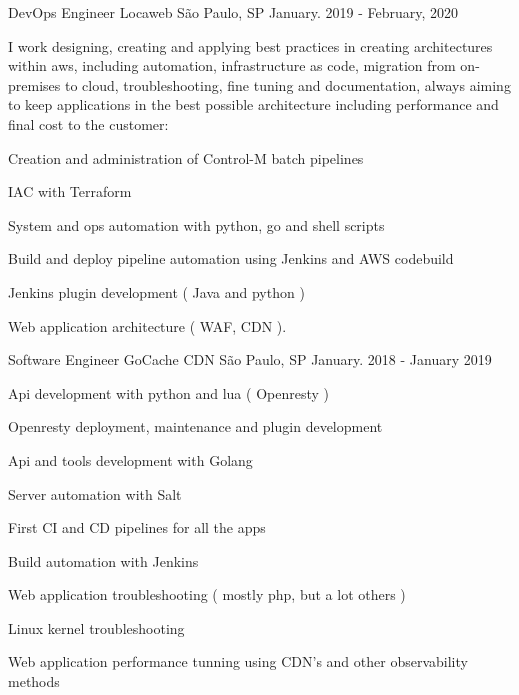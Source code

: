 \begin{cventries}
  \cventry
    {DevOps Engineer} %
    {Locaweb} %
    {São Paulo, SP} %
    {January. 2019 - February, 2020} %
    {
      \begin{cvitems} %
       \item {I work designing, creating and applying best practices in creating architectures within aws, including automation, infrastructure as code, migration from on-premises to cloud, troubleshooting, fine tuning and documentation, always aiming to keep applications in the best possible architecture including performance and final cost to the customer:}
       \item {Creation and administration of  Control-M batch pipelines}
       \item {IAC with Terraform}
       \item {System and ops automation with python, go and shell scripts}
       \item {Build and deploy pipeline automation using Jenkins and AWS codebuild}
       \item {Jenkins plugin development ( Java and python )}
       \item {}
       \item {}
       \item {Web application architecture ( WAF, CDN ).}
      \end{cvitems}
    }

  \cventry
    {Software Engineer} %
    {GoCache CDN} %
    {São Paulo, SP} %
    {January. 2018 - January 2019} %
    {
      \begin{cvitems} %
       \item {Api development with python and lua ( Openresty )}
       \item {Openresty deployment, maintenance and plugin development}
       \item {Api and tools development with Golang}
       \item {Server automation with Salt}
       \item {First CI and CD pipelines for all the apps }
       \item {Build automation with Jenkins}
       \item {Web application troubleshooting ( mostly php, but a lot others )}
       \item {Linux kernel troubleshooting}
       \item {Web application performance tunning using CDN's and other observability methods}
      \end{cvitems}
    }


\end{cventries}

